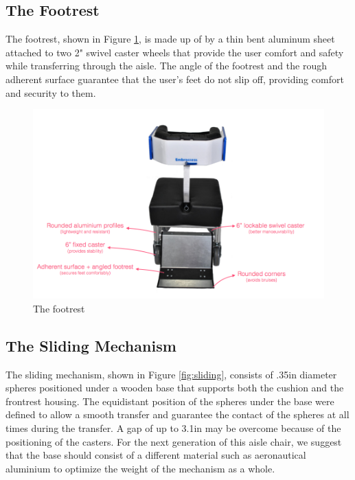 \subsection{The Footrest}

The footrest, shown in Figure \ref{fig:footrest},  is made up of by a thin bent aluminum sheet attached to two 2" swivel caster wheels that provide the user comfort and safety while transferring through the aisle. The angle of the footrest and the rough adherent surface guarantee that the user's feet do not slip off, providing comfort and security to them.
 

\begin{figure}[h]
\centering
\includegraphics[width=13cm]{images/AisleWheelchair2.png}
\caption{The footrest}
\label{fig:footrest}
\end{figure}

\subsection{The Sliding Mechanism}

The sliding mechanism, shown in Figure \ref{fig:sliding},  consists of .35in diameter spheres positioned under a wooden base that supports both the cushion and the frontrest housing. The equidistant position of the spheres under the base were defined to allow a smooth transfer and  guarantee the contact of the spheres at all times during the transfer. A gap of up to 3.1in may be overcome because of the positioning of the casters. For the next generation of this aisle chair, we suggest that the base should consist of a different material such as aeronautical aluminium to optimize the weight of the mechanism as a whole.


